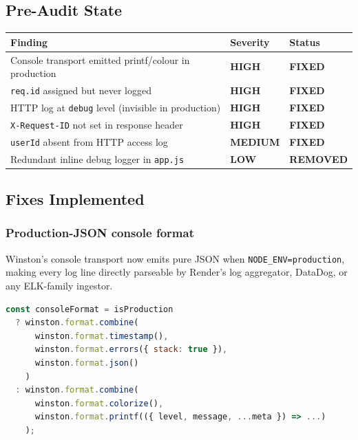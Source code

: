\documentclass[12pt,a4paper]{article}
\newcommand{\cellok}[1]{\cellcolor{ok!15}\textbf{\color{ok}#1}}
\newcommand{\cellwarn}[1]{\cellcolor{warn!20}\textbf{\color{warn}#1}}
\newcommand{\cellinfo}[1]{\cellcolor{info!10}\textbf{\color{info}#1}}
\begin{document}
\subsection{Pre-Audit State}

\begin{longtable}{p{5cm}p{3.5cm}p{5.5cm}}
\toprule
\rowcolor{tableheadbg}
\textbf{\color{white}Finding} & \textbf{\color{white}Severity} & \textbf{\color{white}Status} \\
\midrule
Console transport emitted printf/colour in production & \cellwarn{HIGH} & \cellok{FIXED} \\
\texttt{req.id} assigned but never logged & \cellwarn{HIGH} & \cellok{FIXED} \\
HTTP log at \texttt{debug} level (invisible in production) & \cellwarn{HIGH} & \cellok{FIXED} \\
\texttt{X-Request-ID} not set in response header & \cellwarn{HIGH} & \cellok{FIXED} \\
\texttt{userId} absent from HTTP access log & \cellinfo{MEDIUM} & \cellok{FIXED} \\
Redundant inline debug logger in \texttt{app.js} & \cellok{LOW} & \cellok{REMOVED} \\
\bottomrule
\end{longtable}

\subsection{Fixes Implemented}

\subsubsection{Production-JSON console format}

Winston's console transport now emits pure JSON when
\texttt{NODE\_ENV=production}, making every log line directly parseable by
Render's log aggregator, DataDog, or any ELK-family ingestor.

\begin{lstlisting}[language=JavaScript,caption={logger.js — conditional format}]
const consoleFormat = isProduction
  ? winston.format.combine(
      winston.format.timestamp(),
      winston.format.errors({ stack: true }),
      winston.format.json()
    )
  : winston.format.combine(
      winston.format.colorize(),
      winston.format.printf(({ level, message, ...meta }) => ...)
    );
\end{lstlisting}
\end{document}
